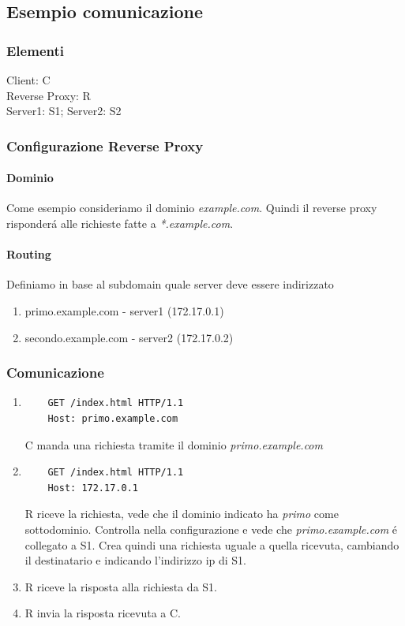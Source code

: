 \subsection{Esempio comunicazione}
\subsubsection{Elementi}
Client: C\\ Reverse Proxy: R\\ Server1: S1; Server2: S2
\subsubsection{Configurazione Reverse Proxy}
\paragraph{Dominio} Come esempio consideriamo il dominio \textit{example.com}. Quindi il reverse proxy risponderá alle richieste fatte a \textit{*.example.com}.
\paragraph{Routing} Definiamo in base al subdomain quale server deve essere indirizzato
\begin{enumerate}
  \item primo.example.com - server1 (172.17.0.1)
  \item secondo.example.com - server2 (172.17.0.2)
\end{enumerate}
\subsubsection{Comunicazione}
\begin{enumerate}
  \item
  \begin{verbatim}
	GET /index.html HTTP/1.1
	Host: primo.example.com
  \end{verbatim}
	C manda una richiesta tramite il dominio \textit{primo.example.com}
  \item
	\begin{verbatim}
	GET /index.html HTTP/1.1
	Host: 172.17.0.1
	\end{verbatim}
	R riceve la richiesta, vede che il dominio indicato ha \textit{primo} come sottodominio. Controlla nella configurazione e vede che \textit{primo.example.com} é collegato a S1. Crea quindi una richiesta uguale a quella ricevuta, cambiando il destinatario e indicando l'indirizzo ip di S1.
  \item R riceve la risposta alla richiesta da S1.
  \item R invia la risposta ricevuta a C.
\end{enumerate}


